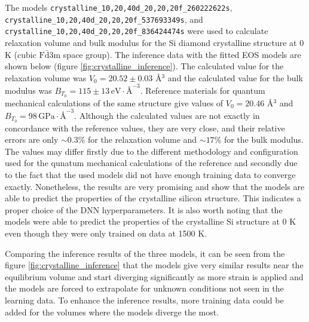 The models \texttt{crystalline\_10,20,40d\_20,20,20f\_260222622s},
\texttt{cryst\-alline\_10,20,40d\_20,20,20f\_537693349s}, and
\texttt{crystalline\_10,20,\linebreak{}40d\_20,20,20f\_836424474s} were used to calculate
relaxation volume and bulk modulus for the Si diamond crystalline structure
at 0 K (cubic $\mathrm{F}\bar{\mathrm{d}}\mathrm{3m}$ space group). The
inference data with the fitted EOS models are shown below (figure
\ref{fig:crystalline_inference}). The calculated value for the relaxation
volume was $V_0 = 20.52 \pm 0.03$ \AA$^3$ and the calculated value for the
bulk modulus was
$B_{T_0} = 115 \pm 13 \, \mathrm{eV} \cdot \text{\AA}^{-3}$. Reference
materials for quantum mechanical calculations of the same structure give
values of $V_0 = 20.46$ \AA$^3$ and
$B_{T_0} = 98 \, \mathrm{GPa} \cdot \text{\AA}^{-3}$\cite{osti_1190959}.
Although the calculated values are not exactly in concordance with the
reference values, they are very close, and their relative errors are
only $\sim 0.3\%$ for the relaxation volume and $\sim 17 \%$ for the bulk
modulus. The values may differ firstly due to the different methodology and
configuration used for the qunatum mechanical calculations of the reference
and secondly due to the fact that the used models did not have enough training
data to converge exactly. Nonetheless, the results are very promising and show
that the models are able to predict the properties of the crystalline silicon
structure. This indicates a proper choice of the DNN hyperparameters. It is
also worth noting that the models were able to predict the properties of the
crystalline Si structure at 0 K even though they were only trained on data at
1500 K.

Comparing the inference results of the three models, it can be seen from the
figure \ref{fig:crystalline_inference} that the models give very similar
results near the equilibrium volume and start diverging significantly as more
strain is applied and the models are forced to extrapolate for unknown
conditions not seen in the learning data. To enhance the inference results,
more training data could be added for the volumes where the models diverge the
most.

